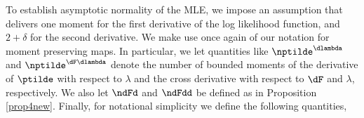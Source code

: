 %    
%    
%    
%    
%
% 
%
%
%
%

To establish asymptotic normality of the MLE, we impose an assumption that delivers one moment for the first derivative of the log likelihood function, and $2+\delta$ for the second derivative. We make use once again of our notation for moment preserving maps. In particular, we let quantities like $\nptilde^{\dlambda}$ and $\nptilde^{\dF \dlambda}$ 
denote the number of bounded moments of the derivative of $\ptilde$ with respect to $\lambda$ and 
the cross derivative with respect to $\dF$ and $\lambda$, respectively. We also let
$\ndFd$ and $\ndFdd$ be defined as in Proposition \ref{prop4new}. Finally, for notational simplicity we define the following quantities, 

